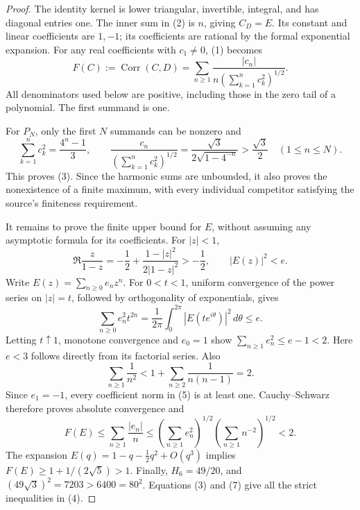 \documentclass[11pt]{article}
\newcommand{\Corr}{\operatorname{Corr}}
\begin{document}
\begin{proof}
The identity kernel is lower triangular, invertible, integral, and
has diagonal entries one. The inner sum in (2) is \(n\), giving
\(C_D=E\). Its constant and linear coefficients are \(1,-1\);
its coefficients are rational by the formal exponential expansion.
For any real coefficients with \(c_1\ne0\), (1) becomes
\[
 F(C):=\Corr(C,D)
   =\sum_{n\geq1}\frac{|c_n|}
      {n\left(\sum_{k=1}^n c_k^2\right)^{1/2}}.           \tag{5}
\]
All denominators used below are positive, including those in the
zero tail of a polynomial. The first summand is one.

For \(P_N\), only the first \(N\) summands can be nonzero and
\[
 \sum_{k=1}^n c_k^2=\frac{4^n-1}{3},\qquad
 \frac{c_n}{\left(\sum_{k=1}^nc_k^2\right)^{1/2}}
 =\frac{\sqrt3}{2\sqrt{1-4^{-n}}}>\frac{\sqrt3}{2}
 \quad(1\leq n\leq N).
\]
This proves (3). Since the harmonic sums are unbounded, it also
proves the nonexistence of a finite maximum, with every individual
competitor satisfying the source's finiteness requirement.

It remains to prove the finite upper bound for \(E\), without
assuming any asymptotic formula for its coefficients.
For \(|z|<1\),
\[
 \Re\frac{z}{1-z}
    =-\frac12+\frac{1-|z|^2}{2|1-z|^2}>-\frac12,
 \qquad |E(z)|^2<e.                                    \tag{6}
\]
Write \(E(z)=\sum_{n\geq0}e_nz^n\). For \(0<t<1\), uniform
convergence of the power series on \(|z|=t\), followed by
orthogonality of exponentials, gives
\[
 \sum_{n\geq0}e_n^2t^{2n}
 =\frac1{2\pi}\int_0^{2\pi}|E(te^{i\theta})|^2\,d\theta
 \leq e.
\]
Letting \(t\uparrow1\), monotone convergence and \(e_0=1\) show
\(\sum_{n\geq1}e_n^2\leq e-1<2\).
Here \(e<3\) follows directly from its factorial series.
Also
\[
 \sum_{n\geq1}\frac1{n^2}
 <1+\sum_{n\geq2}\frac1{n(n-1)}=2.
\]
Since \(e_1=-1\), every coefficient norm in (5) is at least one.
Cauchy--Schwarz therefore proves absolute convergence and
\[
 F(E)\leq\sum_{n\geq1}\frac{|e_n|}{n}
 \leq\left(\sum_{n\geq1}e_n^2\right)^{1/2}
     \left(\sum_{n\geq1}n^{-2}\right)^{1/2}<2.            \tag{7}
\]
The expansion \(E(q)=1-q-\tfrac12q^2+O(q^3)\) implies
\(F(E)\geq1+1/(2\sqrt5)>1\).
Finally, \(H_6=49/20\), and
\((49\sqrt3)^2=7203>6400=80^2\). Equations (3) and (7)
give all the strict inequalities in (4).
\end{proof}
\end{document}

